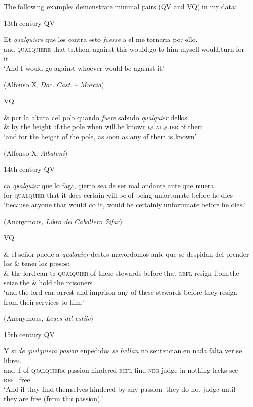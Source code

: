 The following examples demonstrate minimal pairs (QV and VQ) in my data:

\ea \label{ex:key:283}
  13th century
\ea \label{ex:key:283-1} 
QV 

\gll Et \textit{qualquiere} que les contra esto \textit{fuesse} a el me tornaria por ello.\\
and \textsc{qualquiere} that to.them against this would.go to him myself would.turn for it\\
\glt ‘And I would go against whoever would be against it.’

      (Alfonso X, \textit{Doc. Cast. – Murcia})
      
\ex \label{ex:key:183-2} 
VQ

\gll \& por la altura del polo quando \textit{fuere} sabudo \textit{qualquier} {dellos}.\\
 \& by the height of.the pole when will.be known \textsc{qualquier} of.them\\
\glt ‘and for the height of the pole, as soon as any of them is known’

      (Alfonso X, \textit{Albateni})
\z
\z

\ea \label{ex:key:284}
  14th century
\ea \label{ex:key:284-1} 
QV

\gll ca \textit{qualquier} que lo faga, çierto sea de ser {mal andante} ante que muera.\\
 for \textsc{qualquier} that it does certain will.be of being unfortunate before he dies\\
\glt ‘because anyone that would do it, would be certainly unfortunate before he dies.’

(Anonymous, \textit{Libro del Caballero Zifar})
      
\ex \label{ex:key:284-2} 
VQ

\gll  \& el señor {puede} {a} \textit{qualquier} destos mayordomos ante que se despidan del prender los \& tener los presos:\\
 \& the lord can to \textsc{qualquier} of-these stewards before that \textsc{refl} resign from.the seize the \& hold the prisoners\\
\glt ‘and the lord can arrest and imprison any of these stewards before they resign from their services to him:’

      (Anonymous, \textit{Leyes del estilo})
\z
\z

\ea \label{ex:key:285}
  15th century
\ea \label{ex:key:285-1} QV  

\gll Y si \textit{de} \textit{qualquiera} \textit{pasion} enpedidos \textit{se} \textit{hallan} no sentencian en nada falta ver se libres.\\
and if of \textsc{qualquiera} passion hindered \textsc{refl} find \textsc{neg} judge in nothing lacks see \textsc{refl} free\\ 
\glt ‘And if they find themselves hindered by any passion, they do not judge until they are free (from this passion).’

